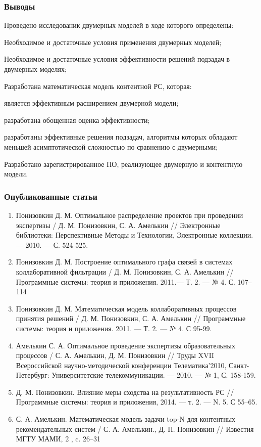 \documentclass[10pt,xcolor={usenames,dvipsnames}]{beamer}
\theoremstyle{break}
\begin{document}
\begin{frame}
  \frametitle{Выводы}
  \begin{itemize}
  \scriptsize{
  \item Проведено исследованик двумерных моделей в ходе которого определены:
    \begin{itemize}
	\scriptsize{
    \item Необходимое и достаточные условия применения двумерных
		моделей;
    \item Необходимое и достаточные условия эффективности
		решений подзадач в двумерных моделях;
		}
    \end{itemize}
  \item Разработана математическая модель контентной РС, которая:
        \begin{itemize}
		\scriptsize{
        \item является эффективным расширением двумерной модели;
        \item разработана обощенная оценка эффективности;
        \item разработаны эффективные решения подзадач, алгоритмы которых
			обладают меньшей асимптотической сложностью по сравнению с
				двумерными;
				}
        \end{itemize}
  \item Разработано зарегистрированное ПО, реализующее двумерную и контентную модели.
	  }
  \end{itemize}
\end{frame}

\begin{frame}
  \frametitle{Опубликованные статьи}
  \scriptsize{
\begin{enumerate}
\item Понизовкин Д. М. Оптимальное распределение проектов при проведении экспертизы / Д. М. Понизовкин, С. А. Амелькин // 
Электронные библиотеки: Перспективные Методы и Технологии, Электронные коллекции. --- 2010. --- С. 524-525.
\item Понизовкин Д. М. Построение оптимального графа связей в системах коллаборативной фильтрации / Д. М. Понизовкин, С. А. Амелькин // 
Программные системы: теория и приложения. 2011.--- Т. 2. --- № 4. С. 107–114
\item Понизовкин Д. М. Математическая модель коллаборативных процессов принятия решений / Д. М. Понизовкин, С. А. Амелькин // 
Программные системы: теория и приложения. 2011. --- Т. 2. --- № 4. С 95-99.
\item Амелькин С. А. Оптимальное проведение экспертизы образовательных процессов / С. А. Амелькин, Д. М. Понизовкин // 
Труды XVII Всероссийской научно-методической конференции Телематика’2010, Санкт-Петербург: Университетские телекоммуникации. --- 2010. ---
№ 1, С. 158-159.
\item Д. М. Понизовкин. Влияние меры сходства на результативность РС // Программные системы: теория и приложения, 2014. --- т. 2. --- N. 5. С 55–65.
\item С. А. Амелькин. Математическая модель задачи top-N для контентных рекомендательных систем / С. А. Амелькин., Д. П. Понизовкин //
Известия МГТУ МАМИ, 2 , c. 26–31
\end{enumerate}
}
\end{frame}
\end{document}
